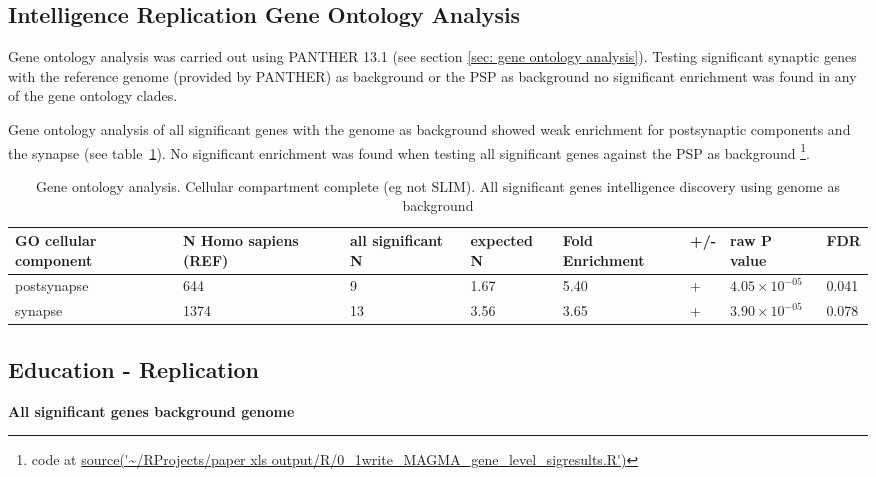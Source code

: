 \subsection{Intelligence Replication Gene Ontology Analysis}

Gene ontology analysis was carried out using PANTHER 13.1 (see section \ref{sec: gene ontology analysis}). Testing significant synaptic genes with the reference genome (provided by PANTHER) as background or the PSP as background no significant enrichment was found in any of the gene ontology clades.

Gene ontology analysis of all significant genes with the genome as background showed weak enrichment for postsynaptic components and the synapse (see table~\ref{tab:GO analysis CC Significant discovery genes}). No significant enrichment was found when testing all significant genes against the PSP as background \footnote{code at \url{source('~/RProjects/paper  xls  output/R/0_1write_MAGMA_gene_level_sigresults.R')}}. 

\begin{table}[h]
    \centering
    \begin{adjustbox}{width=\textwidth}
 
    \begin{tabular}{llllllll}
    \toprule
    
    GO cellular component  & N Homo sapiens (REF)	& all significant  N &	expected N &	Fold Enrichment& 	+/- &	raw P value &	FDR \\
    \midrule
     postsynapse &	644& 	9 &	1.67& 	5.40& 	+ &	$4.05 \times 10^{-05}$ &	0.041      \\
     synapse &	1374 &	13 &	3.56 	&3.65 	&+ &	$3.90\times 10^{-05}$ &	0.078    \\ 
     \bottomrule
    \end{tabular}
    \end{adjustbox}
    \caption{Gene ontology analysis. Cellular compartment complete (eg not SLIM). All significant genes intelligence discovery using genome as background}
    \label{tab:GO analysis CC Significant discovery genes}
\end{table}
 	





\subsection{Education - Replication}
\textbf{All significant genes background genome}

